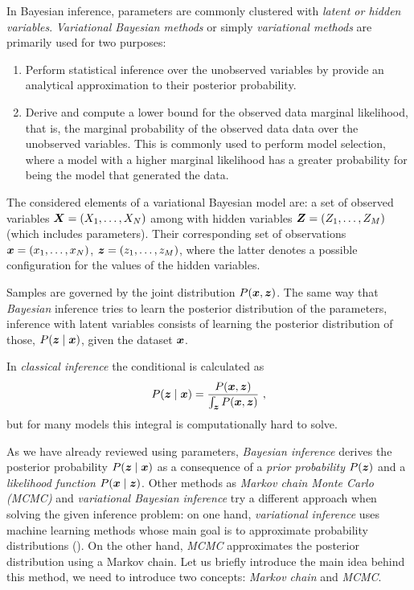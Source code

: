 
In Bayesian inference, parameters are commonly clustered with \emph{latent or hidden variables}. \emph{Variational Bayesian methods} or simply \emph{variational methods} are primarily used for two purposes:

 \begin{enumerate}  \setlength{\itemsep}{1pt}
   \item Perform statistical inference over the unobserved variables by provide an analytical approximation to their posterior probability.
   \item Derive and compute a lower bound for the observed data marginal likelihood, that is, the marginal probability of the observed data data over the unobserved variables. This is commonly used to perform model selection, where a model with a higher marginal likelihood has a greater probability for being the model that generated the data.
 \end{enumerate}

 The considered elements of a variational Bayesian model are: a set of observed variables \(\bm{X} = (X_{1},\dots,X_{N})\) among with hidden variables \(\bm{Z} = (Z_{1},\dots,Z_{M})\) (which includes parameters). Their corresponding set of observations \(\bm{x} = (x_{1},\dots, x_{N})\),  \(\bm{z} = (z_{1}, \dots, z_{M})\), where the latter denotes a possible configuration for the values of the hidden variables.

Samples are governed by the joint distribution \(P(\bm{x}, \bm{z})\). The same way that \emph{Bayesian} inference tries to learn the posterior distribution of the parameters, inference with latent variables consists of learning the posterior distribution of those, \(P(\bm{z} \mid \bm{x})\), given the dataset \(\bm{x}\).

In \emph{classical inference} the conditional is calculated as
\[
  P(\bm{z} \mid \bm{x}) = \frac{P(\bm{x}, \bm{z})}{\int_{\bm{z}} P(\bm{x},\bm{z})}\ ,
\]
but for many models this integral is computationally hard to solve.

As we have already reviewed using parameters, \emph{Bayesian inference} derives the posterior probability \(P(\bm{z} \mid \bm{x})\) as a consequence of a \emph{prior probability} \(P(\bm{z})\) and a \emph{likelihood function} \(P(\bm{x} \mid \bm{z})\). Other methods as \emph{Markov chain Monte Carlo (MCMC)} and \emph{variational Bayesian inference} try a different approach when solving the given inference problem: on one hand, \emph{variational inference} uses machine learning methods whose main goal is to approximate probability distributions (\cite{jordan1999introduction, wainwright}). On the other hand, \emph{MCMC} approximates the posterior distribution using a Markov chain. Let us briefly introduce the main idea behind this method, we need to introduce two concepts: \emph{Markov chain} and \emph{MCMC}.

